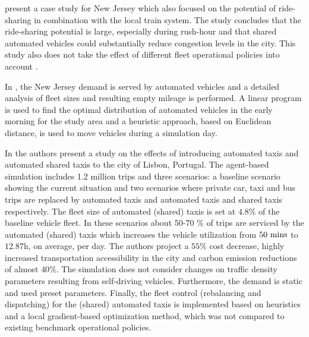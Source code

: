 \cite{zachariah2014uncongested} present a case study for New Jersey which also focused on the potential of ride-sharing in combination with the local train system. The study concludes that the ride-sharing potential is large, especially during rush-hour and that shared automated vehicles could substantially reduce congestion levels in the city. This study also does not take the effect of different fleet operational policies into account .


In \citep{zhu2017interplay}, the New Jersey demand is served by automated vehicles and a detailed analysis of fleet sizes and resulting empty mileage is performed. A linear program is used to find the optimal distribution of automated vehicles in the early morning for the study area and a heuristic approach, based on Euclidean distance, is used to move vehicles during a simulation day.


In \citep{martinez2017assessing} the authors present a study on the effects of introducing automated taxis and automated shared taxis to the city of Lisbon, Portugal. The agent-based simulation includes 1.2 million trips and three scenarios: a baseline scenario showing the current situation and two scenarios where private car, taxi and bus trips are replaced by automated taxis and automated taxis and shared taxis respectively. The fleet size of automated (shared) taxis is set at $4.8\%$ of the baseline vehicle fleet. In these scenarios about 50-70 \% of trips are serviced by the automated (shared) taxis which increases the vehicle utilization from $50 ~ \textnormal{mins}$ to $12.87\text{h}$, on average, per day. The authors project a $55 \%$ cost decrease, highly increased transportation accessibility in the city and carbon emission reductions of almost $40\%$. The simulation does not consider  changes on traffic density parameters resulting from self-driving vehicles. Furthermore, the demand is static and used preset parameters. Finally, the fleet control (rebalancing and dispatching) for the (shared) automated taxis is implemented based on heuristics and a local gradient-based optimization method, which was not compared to existing benchmark operational policies.

